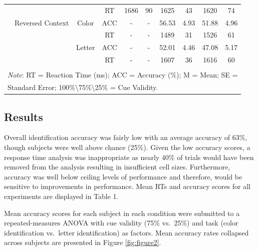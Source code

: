 \documentclass[english,,man,floatsintext]{apa6}
\begin{document}
\begin{table}[htbp]
\begin{tabular}{cccccccccc}
& & & \multicolumn{1}{c}{RT} & \multicolumn{1}{c}{1686} & \multicolumn{1}{c}{90} & \multicolumn{1}{c}{1625} & \multicolumn{1}{c}{43} & \multicolumn{1}{c}{1620} & \multicolumn{1}{c}{74} \\
\cmidrule(rl){3-10}
& \multicolumn{1}{l}{Reversed Context} & \multicolumn{1}{c}{Color} & \multicolumn{1}{c}{ACC} & \multicolumn{1}{c}{-} & \multicolumn{1}{c}{-} & \multicolumn{1}{c}{56.53} & \multicolumn{1}{c}{4.93} & \multicolumn{1}{c}{51.88} & \multicolumn{1}{c}{4.96} \\
& & & \multicolumn{1}{c}{RT} & \multicolumn{1}{c}{-} & \multicolumn{1}{c}{-} & \multicolumn{1}{c}{1489} & \multicolumn{1}{c}{31} & \multicolumn{1}{c}{1526} & \multicolumn{1}{c}{61} \\
& & \multicolumn{1}{c}{Letter} & \multicolumn{1}{c}{ACC} & \multicolumn{1}{c}{-} & \multicolumn{1}{c}{-} & \multicolumn{1}{c}{52.01} & \multicolumn{1}{c}{4.46} & \multicolumn{1}{c}{47.08} & \multicolumn{1}{c}{5.17} \\
& & & \multicolumn{1}{c}{RT} & \multicolumn{1}{c}{-} & \multicolumn{1}{c}{-} & \multicolumn{1}{c}{1607} & \multicolumn{1}{c}{36} & \multicolumn{1}{c}{1616} & \multicolumn{1}{c}{60} \\
 & & & & & & & & & \\
\bottomrule
\multicolumn{10}{l}{\textit{Note}: RT = Reaction Time (ms);  ACC = Accuracy (\%);  M = Mean; SE = } \\
\multicolumn{10}{l}{Standard Error;  100\%\textbackslash 75\%\textbackslash 25\% = Cue Validity.} \\
\end{tabular}%
\end{table}

\subsection{Results}\label{results}

Overall identification accuracy was fairly low with an average accuracy
of 63\%, though subjects were well above chance (25\%). Given the low
accuracy scores, a response time analysis was inappropriate as nearly
40\% of trials would have been removed from the analysis resulting in
insufficient cell sizes. Furthermore, accuracy was well below ceiling
levels of performance and therefore, would be sensitive to improvements
in performance. Mean RTs and accuracy scores for all experiments are
displayed in Table 1.

Mean accuracy scores for each subject in each condition were submitted
to a repeated-measures ANOVA with cue validity (75\% vs.~25\%) and task
(color identification vs.~letter identification) as factors. Mean
accuracy rates collapsed across subjects are presented in Figure
\ref{fig:figure2}.
\end{document}

